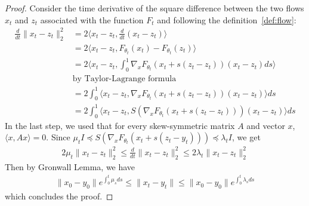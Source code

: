 \begin{proof}
  Consider the time derivative of the square difference between the two flows $x_t$ and $z_t$ associated with the function $F_t$ and following the definition~\ref{def:flow}: 
  \begin{align*}
    \frac{d}{dt} \lVert x_t-z_t\rVert_2^2 & = 2 \big\langle x_t-z_t,\frac{d}{dt}( x_t-z_t)\big\rangle\\
      &=2 \big\langle x_t-z_t,F_{\theta_{t}}(x_{t})-F_{\theta_{t}}(z_{t})\big\rangle \\
      &=  2 \big\langle x_t-z_t,\int_0^1\nabla_xF_{\theta_{t}}(x_{t}+s(z_t-z_t))(x_t-z_t)ds\big\rangle\\
      &\textrm{by Taylor-Lagrange formula}\\ 
      &=  2 \int_0^1\big\langle x_t-z_t,\nabla_xF_{\theta_{t}}(x_{t}+s(z_t-z_t))(x_t-z_t)\big\rangle ds\\
       &=  2 \int_0^1\big\langle x_t-z_t,S(\nabla_xF_{\theta_{t}}(x_{t}+s(z_t-z_t)))(x_t-z_t)\big\rangle ds
  \end{align*}
  In the last step, we used that for every skew-symmetric matrix $A$ and vector $x$, $\langle x,Ax\rangle = 0$.
  Since $\mu_tI\preceq S(\nabla_xF_{\theta_{t}}(x_{t}+s(z_t-y_t)))\preceq  \lambda_tI$, we get
  \begin{align*}
   2\mu_t \lVert x_t-z_t\rVert_2^2 \leq \frac{d}{dt} \lVert x_t-z_t\rVert_2^2 \leq 2\lambda_t \lVert x_t-z_t\rVert_2^2
  \end{align*}
  Then by Gronwall Lemma, we have
  \begin{align*}
    \lVert x_0-y_0 \rVert e^{\int_0^t\mu_s ds}\leq \lVert x_t-y_t \rVert\leq \lVert x_0-y_0 \rVert e^{ \int_0^t\lambda_s ds}
  \end{align*}
  which concludes the proof.
  \end{proof}

